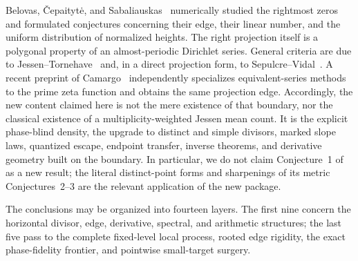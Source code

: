 \documentclass[11pt]{article}
\theoremstyle{definition}
\theoremstyle{remark}
\begin{document}
Belovas, \v{C}epaityt\.{e}, and Sabaliauskas~\cite{BCS2025} numerically studied the
rightmost zeros and formulated conjectures concerning their edge, their linear number,
and the uniform distribution of normalized heights.  The right projection itself is a
polygonal property of an almost-periodic Dirichlet series.  General criteria are due to
Jessen--Tornehave~\cite{JessenTornehave1945} and, in a direct projection form, to
Sepulcre--Vidal~\cite{SepulcreVidal2022}.  A recent preprint of
Camargo~\cite{Camargo2025} independently specializes equivalent-series methods to the
prime zeta function and obtains the same projection edge.  Accordingly, the new content
claimed here is not the mere existence of that boundary, nor the classical existence
of a multiplicity-weighted Jessen mean count.  It is the explicit phase-blind density,
the upgrade to distinct and simple divisors, marked slope laws, quantized escape,
endpoint transfer, inverse theorems, and derivative geometry built on the boundary.
In particular, we do not claim Conjecture~1 of \cite{BCS2025} as a new result; the
literal distinct-point forms and sharpenings of its metric Conjectures~2--3 are the
relevant application of the new package.

The conclusions may be organized into fourteen layers.  The first nine concern
the horizontal divisor, edge, derivative, spectral, and arithmetic structures;
the last five pass to the complete fixed-level local process, rooted edge
rigidity, the exact phase-fidelity frontier, and pointwise small-target surgery.
\end{document}
